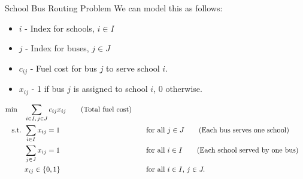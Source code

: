 \begin{examplewithallcode}{School Bus Routing Problem}
We can model this as follows:

\begin{itemize}
    \item \(i \) - Index for schools, \(i \in I\)
    \item \(j \) - Index for buses, \(j \in J\)
\end{itemize}

\begin{itemize}
    \item \(c_{ij} \) - Fuel cost for bus \(j\) to serve school \(i\).
\end{itemize}

\begin{itemize}
    \item \(x_{ij} \) - 1 if bus \(j\) is assigned to school \(i\), 0 otherwise.
\end{itemize}

\begin{align*}
\min \quad & \sum_{i \in I,\, j \in J} c_{ij} x_{ij}   \tag{Total fuel cost} \\
\text{ s.t. }        & \sum_{i \in I} x_{ij} = 1 &&\quad \text{for all } j \in J   \tag{Each bus serves one school} \\
             & \sum_{j \in J} x_{ij} = 1 &&\quad \text{for all } i \in I   \tag{Each school served by one bus} \\
             & x_{ij} \in \{0,1\} &&\quad \text{for all } i \in I,\, j \in J.
\end{align*}
\end{examplewithallcode}

